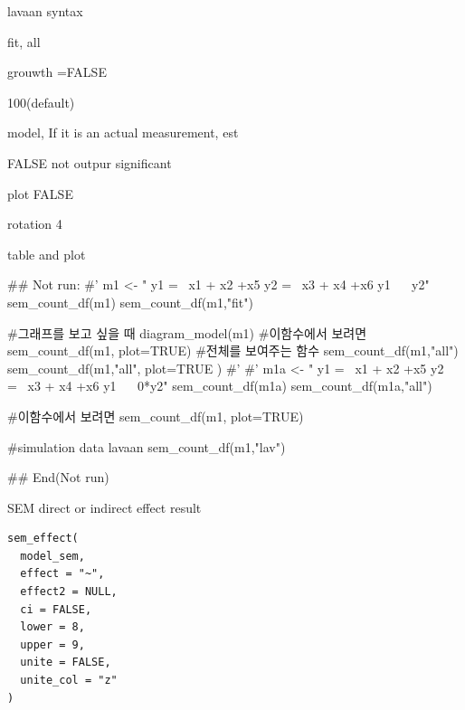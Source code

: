 \documentclass[a4paper]{book}
\begin{document}
\begin{Arguments}
\begin{ldescription}
\item[\code{model}] lavaan syntax

\item[\code{type}] fit, all

\item[\code{growth}] grouwth =FALSE

\item[\code{sample.nobs}] 100(default)

\item[\code{whatLabels}] model, If it is an actual measurement, est

\item[\code{sig}] FALSE not outpur significant

\item[\code{plot}] plot FALSE

\item[\code{rotation}] rotation 4
\end{ldescription}
\end{Arguments}
%
\begin{Value}
table and plot
\end{Value}
%
\begin{Examples}
\begin{ExampleCode}

## Not run: 
#'
m1 <- "
y1 =~ x1 + x2 +x5
y2 =~ x3 + x4 +x6
y1 ~~ y2"
sem_count_df(m1)
sem_count_df(m1,"fit")

#그래프를 보고 싶을 때
diagram_model(m1)
#이함수에서 보려면
sem_count_df(m1, plot=TRUE)
#전체를 보여주는 함수
sem_count_df(m1,"all")
sem_count_df(m1,"all", plot=TRUE )
#'
#'
m1a <- "
y1 =~ x1 + x2 +x5
y2 =~ x3 + x4 +x6
y1 ~~ 0*y2"
sem_count_df(m1a)
sem_count_df(m1a,"all")

#이함수에서 보려면
sem_count_df(m1, plot=TRUE)

#simulation data lavaan
sem_count_df(m1,"lav")


## End(Not run)
\end{ExampleCode}
\end{Examples}
%
\begin{Description}
SEM direct or indirect  effect result
\end{Description}
%
\begin{Usage}
\begin{verbatim}
sem_effect(
  model_sem,
  effect = "~",
  effect2 = NULL,
  ci = FALSE,
  lower = 8,
  upper = 9,
  unite = FALSE,
  unite_col = "z"
)
\end{verbatim}
\end{Usage}
\end{document}

